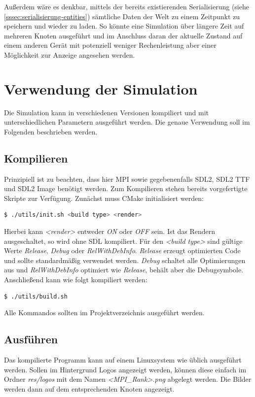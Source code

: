 \documentclass[course=erap]{aspdoc}
\begin{document}
Außerdem wäre es denkbar, mittels der bereits existierenden Serialisierung (siehe \ref{sssec:serialisierung-entities}) sämtliche Daten der Welt zu einem Zeitpunkt zu speichern und wieder zu laden. So könnte eine Simulation über längere Zeit auf mehreren Knoten ausgeführt und im Anschluss daran der aktuelle Zustand auf einem anderen Gerät mit potenziell weniger Rechenleistung aber einer Möglichkeit zur Anzeige angesehen werden.

\section{Verwendung der Simulation}
Die Simulation kann in verschiedenen Versionen kompiliert und mit unterschiedlichen Parametern ausgeführt werden. Die genaue Verwendung soll im Folgenden beschrieben werden.
\subsection{Kompilieren}
Prinzipiell ist zu beachten, dass hier MPI sowie gegebenenfalls SDL2, SDL2 TTF und SDL2 Image benötigt werden.
Zum Kompilieren stehen bereits vorgefertigte Skripte zur Verfügung. Zunächst muss CMake initialisiert werden:
\begin{lstlisting}[language=bash]
  $ ./utils/init.sh <build type> <render>
\end{lstlisting}
Hierbei kann \emph{<render>} entweder \emph{ON} oder \emph{OFF} sein. Ist das Rendern ausgeschaltet, so wird ohne SDL kompiliert. Für den \emph{<build type>} sind gültige Werte \emph{Release}, \emph{Debug} oder \emph{RelWithDebInfo}. \emph{Release} erzeugt optimierten Code und sollte standardmäßig verwendet werden. \emph{Debug} schaltet alle Optimierungen aus und \emph{RelWithDebInfo} optimiert wie \emph{Release}, behält aber die Debugsymbole.
Anschließend kann wie folgt kompiliert werden:
\begin{lstlisting}[language=bash]
  $ ./utils/build.sh
\end{lstlisting}
Alle Kommandos sollten im Projektverzeichnis ausgeführt werden.

\subsection{Ausführen}
Das kompilierte Programm kann auf einem Linuxsystem wie üblich ausgeführt werden. Sollen im Hintergrund Logos angezeigt werden, können diese einfach im Ordner \emph{res/logos} mit dem Namen \emph{<MPI\_Rank>.png} abgelegt werden. Die Bilder werden dann auf dem entsprechenden Knoten angezeigt.
\end{document}
